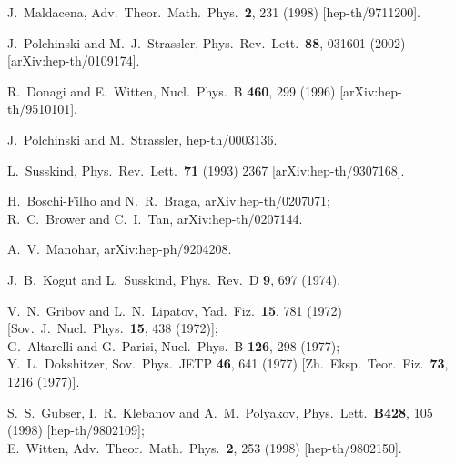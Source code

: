 \begin{thebibliography}{}

J.~Maldacena,
Adv.\ Theor.\ Math.\ Phys.\  {\bf 2}, 231 (1998)
[hep-th/9711200].

J.~Polchinski and M.~J.~Strassler,
Phys.\ Rev.\ Lett.\  {\bf 88}, 031601 (2002)
[arXiv:hep-th/0109174].

R.~Donagi and E.~Witten,
Nucl.\ Phys.\ B {\bf 460}, 299 (1996)
[arXiv:hep-th/9510101].

J.~Polchinski and M.~Strassler, hep-th/0003136.

L.~Susskind,
Phys.\ Rev.\ Lett.\  {\bf 71} (1993) 2367
[arXiv:hep-th/9307168].

H.~Boschi-Filho and N.~R.~Braga,
arXiv:hep-th/0207071;\\
R.~C.~Brower and C.~I.~Tan,
arXiv:hep-th/0207144.

A.~V.~Manohar,
arXiv:hep-ph/9204208.

J.~B.~Kogut and L.~Susskind,
Phys.\ Rev.\ D {\bf 9}, 697 (1974).


V.~N.~Gribov and L.~N.~Lipatov,
Yad.\ Fiz.\  {\bf 15}, 781 (1972)
[Sov.\ J.\ Nucl.\ Phys.\  {\bf 15}, 438 (1972)];\\
G.~Altarelli and G.~Parisi,
Nucl.\ Phys.\ B {\bf 126}, 298 (1977);\\
Y.~L.~Dokshitzer,
Sov.\ Phys.\ JETP {\bf 46}, 641 (1977)
[Zh.\ Eksp.\ Teor.\ Fiz.\  {\bf 73}, 1216 (1977)].


S.~S.~Gubser, I.~R.~Klebanov and A.~M.~Polyakov,
Phys.\ Lett.\  {\bf B428}, 105 (1998)
[hep-th/9802109];\\
E.~Witten,
Adv.\ Theor.\ Math.\ Phys.\  {\bf 2}, 253 (1998)
[hep-th/9802150].


\end{thebibliography}
